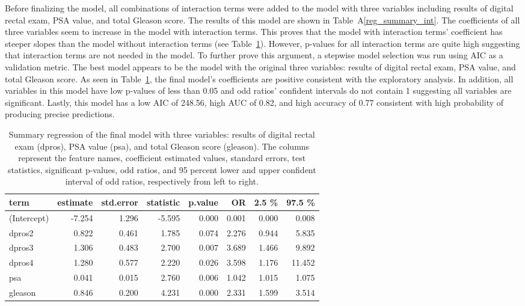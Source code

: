 \documentclass[11pt]{article}\usepackage[]{graphicx}\usepackage[]{color}
\begin{document}
\noindent Before finalizing the model, all combinations of interaction terms were added to the model with three variables including results of digital rectal exam, PSA value, and total Gleason score. The results of this model are shown in Table~A\ref{reg_summary_int}. The coefficients of all three variables seem to increase in the model with interaction terms. This proves that the model with interaction terms’ coefficient has steeper slopes than the model without interaction terms (see Table~\ref{reg_summary_final}). However, p-values for all interaction terms are quite high suggesting that interaction terms are not needed in the model. To further prove this argument, a stepwise model selection was run using AIC as a validation metric. The best model appears to be the model with the original three variables: results of digital rectal exam, PSA value, and total Gleason score. As seen in Table~\ref{reg_summary_final}, the final model's coefficients are positive consistent with the exploratory analysis. In addition, all variables in this model have low p-values of less than 0.05 and odd ratios’ confident intervals do not contain 1 suggesting all variables are significant. Lastly, this model has a low AIC of 248.56, high AUC of 0.82, and high accuracy of 0.77 consistent with high probability of producing precise predictions.
\noindent 

\begin{center}
\begin{table}[ht]
\centering
\begin{tabular}{lrrrrrrr}
  \hline
term & estimate & std.error & statistic & p.value & OR & 2.5 \% & 97.5 \% \\ 
  \hline
(Intercept) & -7.254 & 1.296 & -5.595 & 0.000 & 0.001 & 0.000 & 0.008 \\ 
  dpros2 & 0.822 & 0.461 & 1.785 & 0.074 & 2.276 & 0.944 & 5.835 \\ 
  dpros3 & 1.306 & 0.483 & 2.700 & 0.007 & 3.689 & 1.466 & 9.892 \\ 
  dpros4 & 1.280 & 0.577 & 2.220 & 0.026 & 3.598 & 1.176 & 11.452 \\ 
  psa & 0.041 & 0.015 & 2.760 & 0.006 & 1.042 & 1.015 & 1.075 \\ 
  gleason & 0.846 & 0.200 & 4.231 & 0.000 & 2.331 & 1.599 & 3.514 \\ 
   \hline
\end{tabular}
\caption{Summary regression of the final model with three variables: results of digital rectal exam (dpros), PSA value (psa), and total Gleason score (gleason). The columns represent the feature names, coefficient estimated values, standard errors, test statistics, significant p-values, odd ratios, and 95 percent lower and upper confident interval of odd ratios, respectively from left to right.} 
\label{reg_summary_final}
\end{table}

\end{center}
\end{document}
